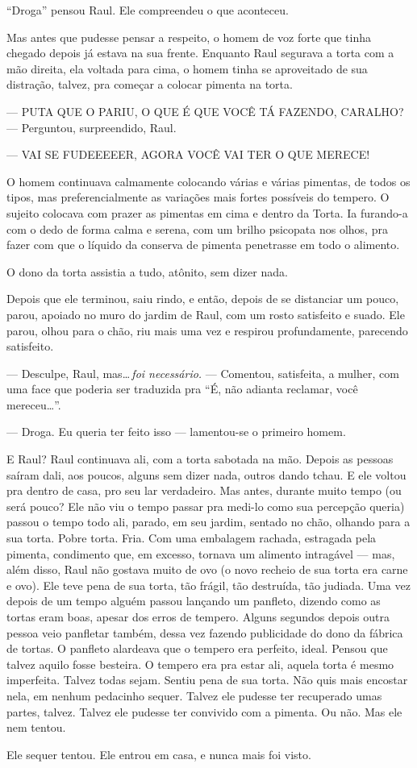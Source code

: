 ``Droga'' pensou Raul. Ele compreendeu o que aconteceu.

Mas antes que pudesse pensar a respeito, o homem de voz forte que tinha chegado depois já estava na sua frente. Enquanto Raul segurava a torta com a mão direita, ela voltada para cima, o homem tinha se aproveitado de sua distração, talvez, pra começar a colocar pimenta na torta.

--- PUTA QUE O PARIU, O QUE É QUE VOCÊ TÁ FAZENDO, CARALHO? --- Perguntou, surpreendido, Raul.

--- VAI SE FUDEEEEER, AGORA VOCÊ VAI TER O QUE MERECE!

O homem continuava calmamente colocando várias e várias pimentas, de todos os tipos, mas preferencialmente as variações mais fortes possíveis do tempero. O sujeito colocava com prazer as pimentas em cima e dentro da Torta. Ia furando-a com o dedo de forma calma e serena, com um brilho psicopata nos olhos, pra fazer com que o líquido da conserva de pimenta penetrasse em todo o alimento.

O dono da torta assistia a tudo, atônito, sem dizer nada.

Depois que ele terminou, saiu rindo, e então, depois de se distanciar um pouco, parou, apoiado no muro do jardim de Raul, com um rosto satisfeito e suado. Ele parou, olhou para o chão, riu mais uma vez e respirou profundamente, parecendo satisfeito.

--- Desculpe, Raul, mas\ldots\,\emph{foi necessário.} --- Comentou, satisfeita, a mulher, com uma face que poderia ser traduzida pra ``É, não adianta reclamar, você mereceu\ldots''.

--- Droga. Eu queria ter feito isso --- lamentou-se o primeiro homem.

E Raul? Raul continuava ali, com a torta sabotada na mão. Depois as pessoas saíram dali, aos poucos, alguns sem dizer nada, outros dando tchau. E ele voltou pra dentro de casa, pro seu lar verdadeiro. Mas antes, durante muito tempo (ou será pouco? Ele não viu o tempo passar pra medi-lo como sua percepção queria) passou o tempo todo ali, parado, em seu jardim, sentado no chão, olhando para a sua torta. Pobre torta. Fria. Com uma embalagem rachada, estragada pela pimenta, condimento que, em excesso, tornava um alimento intragável --- mas, além disso, Raul não gostava muito de ovo (o novo recheio de sua torta era carne e ovo). Ele teve pena de sua torta, tão frágil, tão destruída, tão judiada. Uma vez depois de um tempo alguém passou lançando um panfleto, dizendo como as tortas eram boas, apesar dos erros de tempero. Alguns segundos depois outra pessoa veio panfletar também, dessa vez fazendo publicidade do dono da fábrica de tortas. O panfleto alardeava que o tempero era perfeito, ideal. Pensou que talvez aquilo fosse besteira. O tempero era pra estar ali, aquela torta é mesmo imperfeita. Talvez todas sejam. Sentiu pena de sua torta. Não quis mais encostar nela, em nenhum pedacinho sequer. Talvez ele pudesse ter recuperado umas partes, talvez. Talvez ele pudesse ter convivido com a pimenta. Ou não. Mas ele nem tentou.

Ele sequer tentou. Ele entrou em casa, e nunca mais foi visto.
